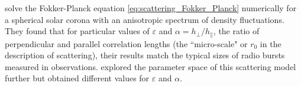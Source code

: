 
\cite{Kontar2019} solve the Fokker-Planck equation \ref{eq:scattering_Fokker_Planck} numerically for a spherical solar corona with an anisotropic spectrum of density fluctuations. They found that for particular values of $\varepsilon$ and $\alpha = h_\perp/h_\parallel$, the ratio of perpendicular and parallel correlation lengths (the ``micro-scale" or $r_0$ in the \cite{Chandrasekhar1952} description of scattering), their results match the typical sizes of radio bursts measured in observations. \cite{Zhang2021} explored the parameter space of this scattering model further but obtained different values for $\varepsilon$ and $\alpha$.


